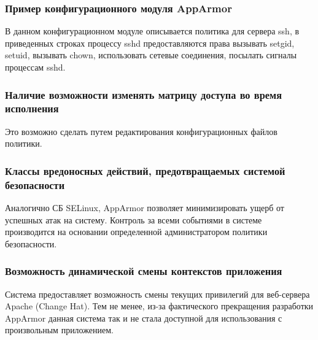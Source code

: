 \subsubsection{Пример конфигурационного модуля AppArmor}


В данном конфигурационном модуле описывается политика
для сервера ssh, в приведенных строках процессу sshd
предоставляются права вызывать setgid, setuid, вызывать
chown, использовать сетевые соединения, посылать сигналы
процессам sshd.



\subsubsection{Наличие возможности изменять матрицу доступа 
	во время исполнения} 

Это возможно сделать путем редактирования конфигурационных
файлов политики. 


\subsubsection{Классы вредоносных действий, предотвращаемых
	системой безопасности} 

Аналогично СБ SELinux, AppArmor позволяет 
минимизировать ущерб от успешных атак на систему. 
Контроль за всеми событиями в системе производится 
на основании определенной администратором политики 
безопасности. 

\subsubsection{Возможность динамической смены 
контекстов приложения} 

Система предоставляет возможность смены
текущих привилегий для веб-сервера Apache
(Change Hat). Тем не менее, из-за фактического
прекращения разработки AppArmor данная 
система так и не стала доступной для использования
с произвольным приложением. 


